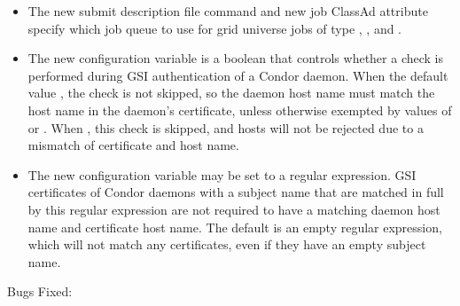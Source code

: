 \begin{itemize}
\item The new  submit description file command
and new job ClassAd attribute  specify which job
queue to use for grid universe jobs of type
, , and .

\item The new configuration variable  is
a boolean that controls whether a check is performed during
GSI authentication of a Condor daemon.  
When the default value ,
the check is not skipped, so the daemon host name must match the
host name in the daemon's certificate, unless otherwise exempted
by values of  or
.
When , this check is skipped, and hosts will not be rejected
due to a mismatch of certificate and host name.

\item The new configuration variable
 may be set to a
regular expression.  GSI certificates of Condor daemons with a
subject name that are matched in full by this regular expression
are not required to have a matching daemon host name and certificate
host name.  The default is an empty regular expression, which will
not match any certificates, even if they have an empty subject name.

\end{itemize}

\noindent Bugs Fixed:

